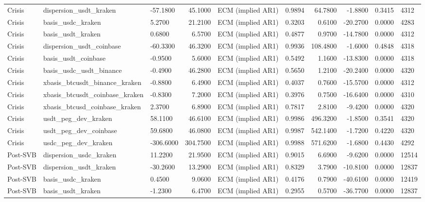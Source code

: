 \begin{table}[H]
\begin{tabular}{lllrrrrrrl}
Crisis & dispersion\_usdt\_kraken & -57.1800 & 45.1000 & ECM (implied AR1) & 0.9894 & 64.7800 & -1.8800 & 0.3415 & 4312 &  \\
Crisis & basis\_usdc\_kraken & 5.2700 & 21.2100 & ECM (implied AR1) & 0.3203 & 0.6100 & -20.2700 & 0.0000 & 4283 &  \\
Crisis & basis\_usdt\_kraken & 0.6800 & 6.5700 & ECM (implied AR1) & 0.4877 & 0.9700 & -14.7800 & 0.0000 & 4312 &  \\
Crisis & dispersion\_usdt\_coinbase & -60.3300 & 46.3200 & ECM (implied AR1) & 0.9936 & 108.4800 & -1.6000 & 0.4848 & 4318 &  \\
Crisis & basis\_usdt\_coinbase & -0.9500 & 5.6000 & ECM (implied AR1) & 0.5492 & 1.1600 & -13.8300 & 0.0000 & 4318 &  \\
Crisis & basis\_usdc\_usdt\_binance & -0.4900 & 46.2800 & ECM (implied AR1) & 0.5650 & 1.2100 & -20.2400 & 0.0000 & 4320 &  \\
Crisis & xbasis\_btcusdt\_binance\_kraken & -0.8800 & 6.4900 & ECM (implied AR1) & 0.4037 & 0.7600 & -15.5700 & 0.0000 & 4312 &  \\
Crisis & xbasis\_btcusdt\_coinbase\_kraken & -0.8300 & 7.2000 & ECM (implied AR1) & 0.3976 & 0.7500 & -16.6400 & 0.0000 & 4310 &  \\
Crisis & xbasis\_btcusd\_coinbase\_kraken & 2.3700 & 6.8900 & ECM (implied AR1) & 0.7817 & 2.8100 & -9.4200 & 0.0000 & 4320 &  \\
Crisis & usdt\_peg\_dev\_kraken & 58.1100 & 46.6100 & ECM (implied AR1) & 0.9986 & 496.3200 & -1.8500 & 0.3541 & 4320 &  \\
Crisis & usdt\_peg\_dev\_coinbase & 59.6800 & 46.0800 & ECM (implied AR1) & 0.9987 & 542.1400 & -1.7200 & 0.4220 & 4320 &  \\
Crisis & usdc\_peg\_dev\_kraken & -306.6000 & 304.7500 & ECM (implied AR1) & 0.9988 & 571.6200 & -1.6800 & 0.4430 & 4292 &  \\
Post-SVB & dispersion\_usdc\_kraken & 11.2200 & 21.9500 & ECM (implied AR1) & 0.9015 & 6.6900 & -9.6200 & 0.0000 & 12514 &  \\
Post-SVB & dispersion\_usdt\_kraken & -30.2600 & 13.2900 & ECM (implied AR1) & 0.8329 & 3.7900 & -10.8100 & 0.0000 & 12837 &  \\
Post-SVB & basis\_usdc\_kraken & 0.4500 & 9.0600 & ECM (implied AR1) & 0.4176 & 0.7900 & -40.6100 & 0.0000 & 12419 &  \\
Post-SVB & basis\_usdt\_kraken & -1.2300 & 6.4700 & ECM (implied AR1) & 0.2955 & 0.5700 & -36.7700 & 0.0000 & 12837 &  \\

\end{tabular}
\end{table}

